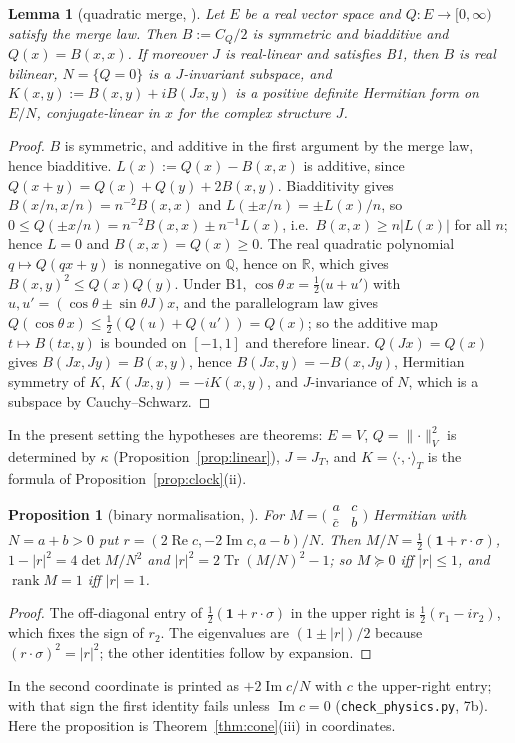 \documentclass[aps,pra,onecolumn,superscriptaddress,nofootinbib,10pt]{revtex4-2}
\newtheorem{proposition}[theorem]{Proposition}
\newtheorem{lemma}[theorem]{Lemma}
\theoremstyle{definition}
\theoremstyle{remark}
\newcommand{\R}{\mathbb{R}}
\newcommand{\rk}{\operatorname{rank}}
\newcommand{\re}{\operatorname{Re}}
\newcommand{\im}{\operatorname{Im}}
\newcommand{\tr}{\operatorname{Tr}}
\newcommand{\ip}[2]{\langle #1,#2\rangle}
\begin{document}
\begin{lemma}[quadratic merge, {\cite[\S4]{CRQO}}]\label{lem:B0}
Let $E$ be a real vector space and $Q\colon E\to[0,\infty)$ satisfy the merge law.  Then $B:=C_Q/2$ is
symmetric and biadditive and $Q(x)=B(x,x)$.  If moreover $J$ is real-linear and satisfies B1, then $B$ is
real bilinear,
$N=\{Q=0\}$ is a $J$-invariant subspace, and $K(x,y):=B(x,y)+iB(Jx,y)$ is a positive definite Hermitian
form on $E/N$, conjugate-linear in $x$ for the complex structure $J$.
\end{lemma}
\begin{proof}
$B$ is symmetric, and additive in the first argument by the merge law, hence biadditive.
$L(x):=Q(x)-B(x,x)$ is additive, since $Q(x+y)=Q(x)+Q(y)+2B(x,y)$.  Biadditivity gives
$B(x/n,x/n)=n^{-2}B(x,x)$ and $L(\pm x/n)=\pm L(x)/n$, so $0\le Q(\pm x/n)=n^{-2}B(x,x)\pm n^{-1}L(x)$,
i.e.\ $B(x,x)\ge n\lvert L(x)\rvert$ for all $n$; hence $L=0$ and $B(x,x)=Q(x)\ge0$.  The real
quadratic polynomial $q\mapsto Q(qx+y)$ is nonnegative on $\mathbb Q$, hence on $\R$, which gives
$B(x,y)^2\le Q(x)Q(y)$.  Under B1, $\cos\theta\,x=\tfrac12\bigl(u+u'\bigr)$ with
$u,u'=(\cos\theta\pm\sin\theta J)x$, and the parallelogram law gives $Q(\cos\theta\,x)\le\tfrac12(Q(u)+Q(u'))=Q(x)$;
so the additive map $t\mapsto B(tx,y)$ is bounded on $[-1,1]$ and therefore linear.  $Q(Jx)=Q(x)$ gives
$B(Jx,Jy)=B(x,y)$, hence $B(Jx,y)=-B(x,Jy)$, Hermitian symmetry of $K$, $K(Jx,y)=-iK(x,y)$, and
$J$-invariance of $N$, which is a subspace by Cauchy--Schwarz.
\end{proof}
In the present setting the hypotheses are theorems: $E=V$, $Q=\lVert\cdot\rVert_V^2$ is determined by
$\kappa$ (Proposition~\ref{prop:linear}), $J=J_T$, and $K=\ip{\cdot}{\cdot}_T$ is the formula of
Proposition~\ref{prop:clock}(ii).

\begin{proposition}[binary normalisation, {\cite[Thm.~4.2]{CRQO}}]\label{prop:binary}
For $M=\bigl(\begin{smallmatrix}a&c\\\bar c&b\end{smallmatrix}\bigr)$ Hermitian with $N=a+b>0$ put
$r=(2\re c,-2\im c,a-b)/N$.  Then $M/N=\tfrac12(\mathbf1+r\cdot\sigma)$, $1-\lvert r\rvert^2=4\det M/N^2$
and $\lvert r\rvert^2=2\tr(M/N)^2-1$; so $M\succeq0$ iff $\lvert r\rvert\le1$, and $\rk M=1$ iff
$\lvert r\rvert=1$.
\end{proposition}
\begin{proof}
The off-diagonal entry of $\tfrac12(\mathbf1+r\cdot\sigma)$ in the upper right is $\tfrac12(r_1-ir_2)$,
which fixes the sign of $r_2$.  The eigenvalues are $(1\pm\lvert r\rvert)/2$ because $(r\cdot\sigma)^2=\lvert r\rvert^2$;
the other identities follow by expansion.
\end{proof}
In \cite{CRQO} the second coordinate is printed as $+2\im c/N$ with $c$ the upper-right entry; with that
sign the first identity fails unless $\im c=0$ (\texttt{check\_physics.py}, 7b).  Here the proposition is
Theorem~\ref{thm:cone}(iii) in coordinates.
\end{document}
